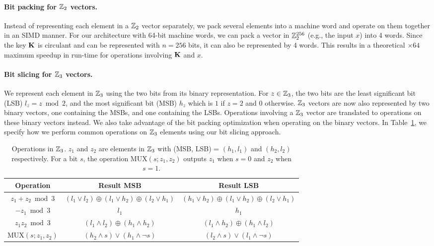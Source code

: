 \iffull
\paragraph{Bit packing for $\mathbb{Z}_2$ vectors.} 
Instead of representing each element in a $\mathbb{Z}_2$ vector separately, we pack several elements into a machine word and operate on them together in an SIMD manner. For our architecture with 64-bit machine words, we can pack a vector in $\mathbb{Z}_2^{256}$ (e.g., the input $x$) into 4 words. Since the key $\mat{K}$ is circulant and can be represented with $n=256$ bits, it can also be represented by 4 words. This results in a theoretical $\times64$ maximum speedup in run-time for operations involving $\mat{K}$ and $x$. 

\paragraph{Bit slicing for $\mathbb{Z}_3$ vectors.}
We represent each element in $\mathbb{Z}_3$ using the two bits from its binary representation. For $z \in \mathbb{Z}_3$, the two bits are the least significant bit (LSB) $l_z = z \bmod 2$, and the most significant bit (MSB) $h_z$ which is $1$ if $z=2$ and $0$ otherwise. $\mathbb{Z}_3$ vectors are now also represented by two binary vectors, one containing the MSBs, and one containing the LSBs. Operations involving a $\mathbb{Z}_3$ vector are translated to operations on these binary vectors instead. We also take advantage of the bit packing optimization when operating on the binary vectors.
In Table~\ref{table:z3_operations}, we specify how we perform common operations on $\mathbb{Z}_3$ elements using our bit slicing approach. 

\begin{table}[ht]
\begin{center}
    \begin{tabular}{|c|c|c|}
        \hline
        Operation & Result MSB & Result LSB\\
        \hline\hline
        $z_1 + z_2 \bmod 3$ & $(l_1 \vee l_2) \oplus (l_1 \vee h_2) \oplus (l_2 \vee h_1)$  & $(h_1 \vee h_2) \oplus (l_1 \vee h_2) \oplus (l_2 \vee h_1)$\\
        $-z_1 \bmod 3$ & $l_1$ & $h_1$ \\
        $z_1z_2 \bmod 3$ & $(l_1 \wedge l_2) \oplus (h_1 \wedge h_2)$ & $(l_1 \wedge h_2) \oplus (h_1 \wedge l_2)$\\
        $\textrm{MUX}(s;z_1,z_2)$ & $(h_2 \wedge s) \vee (h_1 \wedge \neg s)$ & $(l_2 \wedge s) \vee (l_1 \wedge \neg s)$\\
        \hline
    \end{tabular}
\end{center}
\caption{Operations in $\mathbb{Z}_3$. $z_1$ and $z_2$ are elements in $\mathbb{Z}_3$ with (MSB, LSB) = $(h_1,l_1)$ and $(h_2, l_2)$ respectively. For a bit $s$, the operation $\textrm{MUX}(s;z_1, z_2)$ outputs $z_1$ when $s=0$ and $z_2$ when $s=1$.}
\label{table:z3_operations}
\end{table}



